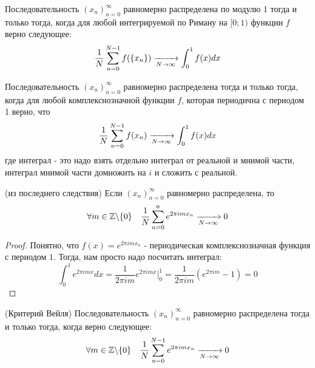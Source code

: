 \begin{corollary}
	Последовательность $(x_n)_{n = 0}^\infty$ равномерно распределена по модулю 1 тогда и только тогда, когда для любой интегрируемой по Риману на $[0; 1)$ функции $f$ верно следующее:
	\[
		\frac{1}{N} \sum\limits_{n = 0}^{N - 1} f(\{x_n\}) \xrightarrow[N \to \infty]{} \int_0^1 f(x)dx
	\] 
\end{corollary}

\begin{corollary}
	Последовательность $(x_n)_{n = 0}^\infty$ равномерно распределена тогда и только тогда, когда для любой комплекснозначной функции $f$, которая периодична с периодом 1 верно, что
	\[
		\frac{1}{N} \sum\limits_{n = 0}^{N - 1} f(x_n) \xrightarrow[N \to \infty]{} \int_0^1 f(x)dx
	\]
	где интеграл - это надо взять отдельно интеграл от реальной и мнимой части, интеграл мнимой части домножить на $i$ и сложить с реальной.
\end{corollary}

\begin{corollary} (из последнего следствия)
	Если $(x_n)_{n = 0}^\infty$ равномерно распределена, то
	\[
		\forall m \in \mathbb{Z} \backslash \{0\} \quad \frac{1}{N} \sum\limits_{n = 0}^n e^{2\pi im x_n} \xrightarrow[N \to \infty]{} 0
	\]
\end{corollary}

\begin{proof}
	Понятно, что $f(x) = e^{2\pi im x_n}$ - периодическая комплекснозначная функция с периодом $1$. Тогда, нам просто надо посчитать интеграл:
	\[
		\int_0^1 e^{2\pi im x}dx = \frac{1}{2\pi im} e^{2\pi im x} \Big|_0^1 = \frac{1}{2\pi im} (e^{2\pi im} - 1) = 0
	\]
\end{proof}

\begin{theorem} (Критерий Вейля)
	Последовательность $(x_n)_{n = 0}^\infty$ равномерно распределена тогда и только тогда, когда верно следующее:
	\[
		\forall m \in \mathbb{Z} \backslash \{0\} \quad \frac{1}{N} \sum\limits_{n = 0}^{N - 1} e^{2\pi im x_n} \xrightarrow[N \to \infty]{} 0
	\]
\end{theorem}

